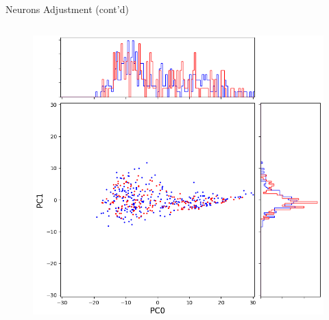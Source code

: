 \documentclass{beamer}
\begin{document}
\begin{frame}{Neurons Adjustment (cont'd)}
\begin{columns}
\begin{column}[t]{.48\textwidth}
\begin{figure}[ht]
        \includegraphics[width=1.0\textwidth,height=0.7\textheight]{figures/pca_after.png}
        \caption*{\label{fig:pca-after}}
      \end{figure}
    \end{column}
  \end{columns}
\end{frame}
\end{document}
